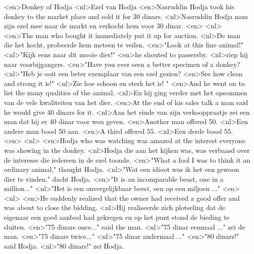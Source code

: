 <en>Donkey of Hodja
<nl>Ezel van Hodja
<en>Nasruddin Hodja took his donkey to the market place and sold it for 30 dinars.
<nl>Nasruddin Hodja nam zijn ezel mee naar de markt en verkocht hem voor 30 dinar.
<en>
<nl>
<en>The man who bought it immediately put it up for auction.
<nl>De man die het kocht, probeerde  hem meteen te veilen.
<en>"Look at this fine animal!"
<nl>"Kijk eens naar dit mooie dier!"
<en>he shouted to passersby.
<nl>riep hij naar voorbijgangers.
<en>"Have you ever seen a better specimen of a donkey?
<nl>"Heb je ooit een beter exemplaar van een ezel gezien?
<en>See how clean and strong it is!"
<nl>Zie hoe schoon en sterk het is! "
<en>And he went on to list the many qualities of the animal.
<nl>En hij ging verder met het opsommen van de vele kwaliteiten van het dier.
<en>At the end of his sales talk a man said he would give 40 dinars for it.
<nl>Aan het einde van zijn verkooppraatje zei een man dat hij er 40 dinar voor wou geven.
<en>Another man offered 50.
<nl>Een andere man bood 50 aan.
<en>A third offered 55.
<nl>Een derde bood 55.
<en>
<nl>
<en>Hodja who was watching was amazed at the interest everyone was showing in the donkey.
<nl>Hodja die aan het kijken was, was verbaasd over de interesse die iedereen in de ezel toonde.
<en>"What a fool I was to think it an ordinary animal," thought Hodja.
<nl>"Wat een idioot was ik het een gewoon dier te vinden," dacht Hodja.
<en>"It is an incomparable beast, one in a million..." 
<nl>"Het is een onvergelijkbaar beest, een op een miljoen ..." 
<en>
<nl>
<en>He suddenly realized that the owner had received a good offer and was about to close the bidding.
<nl>Hij realiseerde zich plotseling dat de eigenaar een goed aanbod had gekregen en op het punt stond de bieding te sluiten.
<en>"75 dinars once..." said the man.
<nl>"75 dinar eenmaal ..." zei de man.
<en>"75 dinars twice..." 
<nl>"75 dinar andermaal ..."
<en>"80 dinars!" said Hodja. 
<nl>"80 dinars!" zei Hodja.
